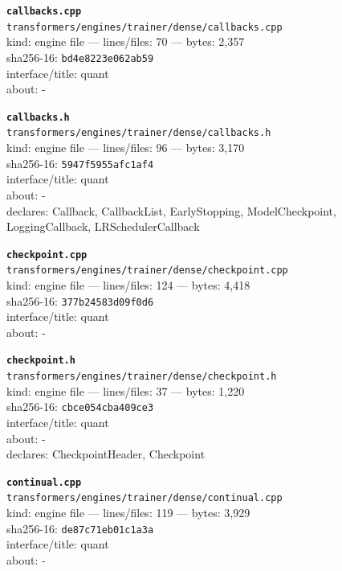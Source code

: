 \noindent\textbf{\texttt{callbacks.cpp}}\\
\texttt{transformers/engines/trainer/dense/callbacks.cpp}\\
kind: engine file --- lines/files: 70 --- bytes: 2,357\\
sha256-16: \texttt{bd4e8223e062ab59}\\
interface/title: quant\\
about: -\\
\vspace*{6.0pt}

\noindent\textbf{\texttt{callbacks.h}}\\
\texttt{transformers/engines/trainer/dense/callbacks.h}\\
kind: engine file --- lines/files: 96 --- bytes: 3,170\\
sha256-16: \texttt{5947f5955afc1af4}\\
interface/title: quant\\
about: -\\
declares: Callback, CallbackList, EarlyStopping, ModelCheckpoint, LoggingCallback, LRSchedulerCallback\\
\vspace*{6.0pt}

\noindent\textbf{\texttt{checkpoint.cpp}}\\
\texttt{transformers/engines/trainer/dense/checkpoint.cpp}\\
kind: engine file --- lines/files: 124 --- bytes: 4,418\\
sha256-16: \texttt{377b24583d09f0d6}\\
interface/title: quant\\
about: -\\
\vspace*{6.0pt}

\noindent\textbf{\texttt{checkpoint.h}}\\
\texttt{transformers/engines/trainer/dense/checkpoint.h}\\
kind: engine file --- lines/files: 37 --- bytes: 1,220\\
sha256-16: \texttt{cbce054cba409ce3}\\
interface/title: quant\\
about: -\\
declares: CheckpointHeader, Checkpoint\\
\vspace*{6.0pt}
\newpage

\noindent\textbf{\texttt{continual.cpp}}\\
\texttt{transformers/engines/trainer/dense/continual.cpp}\\
kind: engine file --- lines/files: 119 --- bytes: 3,929\\
sha256-16: \texttt{de87c71eb01c1a3a}\\
interface/title: quant\\
about: -\\
\vspace*{6.0pt}

